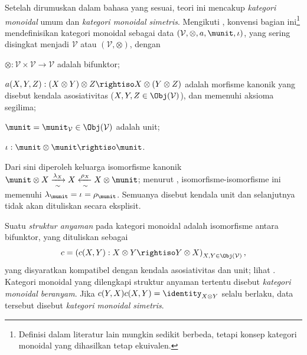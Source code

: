 Setelah dirumuskan dalam bahasa yang sesuai, teori ini mencakup
\emph{kategori monoidal} umum dan \emph{kategori monoidal simetris}. Mengikuti
\cite[Definisi 3.1.1, 3.1.2]{Li1}, konvensi bagian ini\footnote{Definisi dalam
literatur lain mungkin sedikit berbeda, tetapi konsep kategori monoidal yang
dihasilkan tetap ekuivalen.} mendefinisikan kategori monoidal sebagai data
$(\mathcal{V},\otimes,a,\munit,\iota)$, yang sering disingkat menjadi
$\mathcal{V}$ atau $(\mathcal{V},\otimes)$, dengan
\begin{compactitem}
	\item $\otimes: \mathcal{V} \times \mathcal{V} \to \mathcal{V}$ adalah bifunktor;
	\item $a(X, Y, Z): (X \otimes Y) \otimes Z \rightiso X \otimes (Y \otimes Z)$ adalah morfisme kanonik yang disebut kendala asosiativitas ($X, Y, Z \in \Obj(\mathcal{V})$), dan memenuhi aksioma segilima;
	\item $\munit = \munit_{\mathcal{V}} \in \Obj(\mathcal{V})$ adalah unit;
	\item $\iota: \munit \otimes \munit \rightiso \munit$.
\end{compactitem}
Dari sini diperoleh keluarga isomorfisme kanonik
$\munit \otimes X \xrightarrow[\sim]{\lambda_X} X \xleftarrow[\sim]{\rho_X} X \otimes \munit$;
menurut \cite[Lema 3.1.5]{Li1}, isomorfisme-isomorfisme ini memenuhi
$\lambda_{\munit}=\iota=\rho_{\munit}$. Semuanya disebut kendala unit dan
selanjutnya tidak akan dituliskan secara eksplisit.

Suatu \emph{struktur anyaman} pada kategori monoidal adalah isomorfisme antara
bifunktor, yang dituliskan sebagai
\[ c = \left( c(X, Y): X \otimes Y \rightiso Y \otimes X\right)_{X, Y \in \Obj(\mathcal{V})}, \]
yang disyaratkan kompatibel dengan kendala asosiativitas dan unit; lihat
\cite[Definisi 3.3.1]{Li1}. Kategori monoidal yang dilengkapi struktur anyaman
tertentu disebut \emph{kategori monoidal beranyam}. Jika
$c(Y,X)c(X,Y)=\identity_{X\otimes Y}$ selalu berlaku, data tersebut disebut
\emph{kategori monoidal simetris}.

